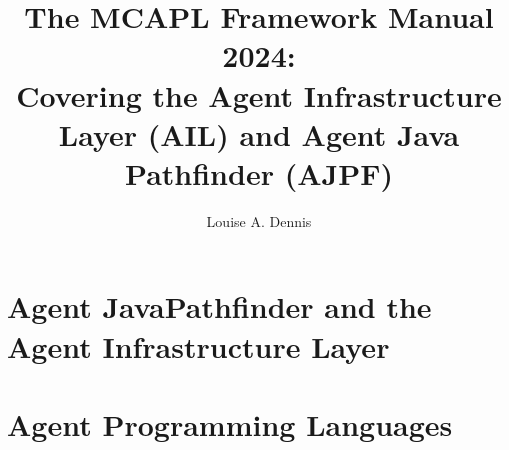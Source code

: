 \documentclass[a4]{book}
\author{Louise A. Dennis}
\title{The MCAPL Framework Manual 2024: \\
Covering the Agent Infrastructure Layer (AIL) and Agent Java Pathfinder (AJPF)}
\begin{document}
\maketitle

\tableofcontents

\SetJava






\part{Agent JavaPathfinder and the Agent Infrastructure Layer}







\part{Agent Programming Languages}













\printindex
\end{document}
